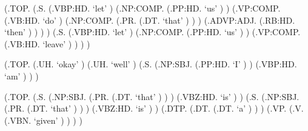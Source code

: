 \documentclass[10pt]{article}
\begin{document}
\begin{parsetree}  (.TOP. (.S. (.VBP:HD. `let' ) (.NP:COMP. (.PP:HD. `us' ) ) (.VP:COMP. (.VB:HD. `do' ) (.NP:COMP. (.PR. (.DT. `that' ) ) ) (.ADVP:ADJ. (.RB:HD. `then' ) ) ) ) (.S. (.VBP:HD. `let' ) (.NP:COMP. (.PP:HD. `us' ) ) (.VP:COMP. (.VB:HD. `leave' ) ) ) ) \end{parsetree}

\begin{parsetree}  (.TOP. (.UH. `okay' ) (.UH. `well' ) (.S. (.NP:SBJ. (.PP:HD. `I' ) ) (.VBP:HD. `am' ) ) ) \end{parsetree}

\begin{parsetree}  (.TOP. (.S. (.NP:SBJ. (.PR. (.DT. `that' ) ) ) (.VBZ:HD. `is' ) ) (.S. (.NP:SBJ. (.PR. (.DT. `that' ) ) ) (.VBZ:HD. `is' ) ) (.DTP. (.DT. (.DT. `a' ) ) ) (.VP. (.V. (.VBN. `given' ) ) ) ) \end{parsetree}
\end{document}
